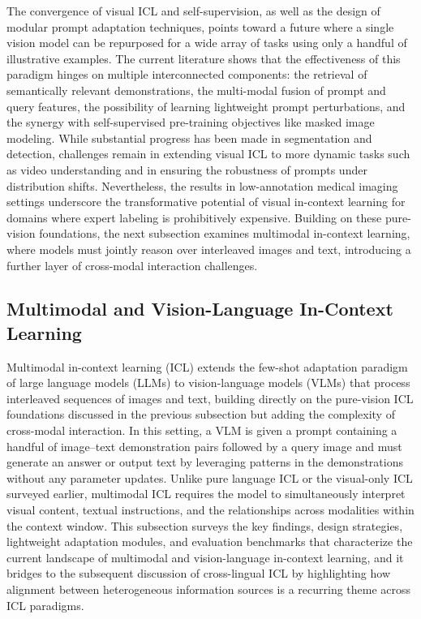 \documentclass[11pt]{article}
\begin{document}
The convergence of visual ICL and self-supervision, as well as the design of modular prompt adaptation techniques, points toward a future where a single vision model can be repurposed for a wide array of tasks using only a handful of illustrative examples. The current literature shows that the effectiveness of this paradigm hinges on multiple interconnected components: the retrieval of semantically relevant demonstrations, the multi-modal fusion of prompt and query features, the possibility of learning lightweight prompt perturbations, and the synergy with self-supervised pre-training objectives like masked image modeling. While substantial progress has been made in segmentation and detection, challenges remain in extending visual ICL to more dynamic tasks such as video understanding and in ensuring the robustness of prompts under distribution shifts. Nevertheless, the results in low-annotation medical imaging settings underscore the transformative potential of visual in-context learning for domains where expert labeling is prohibitively expensive. Building on these pure-vision foundations, the next subsection examines multimodal in-context learning, where models must jointly reason over interleaved images and text, introducing a further layer of cross-modal interaction challenges.

\subsection{Multimodal and Vision-Language In-Context Learning}

Multimodal in-context learning (ICL) extends the few-shot adaptation paradigm of large language models (LLMs) to vision-language models (VLMs) that process interleaved sequences of images and text, building directly on the pure-vision ICL foundations discussed in the previous subsection but adding the complexity of cross-modal interaction. In this setting, a VLM is given a prompt containing a handful of image--text demonstration pairs followed by a query image and must generate an answer or output text by leveraging patterns in the demonstrations without any parameter updates. Unlike pure language ICL or the visual-only ICL surveyed earlier, multimodal ICL requires the model to simultaneously interpret visual content, textual instructions, and the relationships across modalities within the context window. This subsection surveys the key findings, design strategies, lightweight adaptation modules, and evaluation benchmarks that characterize the current landscape of multimodal and vision-language in-context learning, and it bridges to the subsequent discussion of cross-lingual ICL by highlighting how alignment between heterogeneous information sources is a recurring theme across ICL paradigms.
\end{document}
